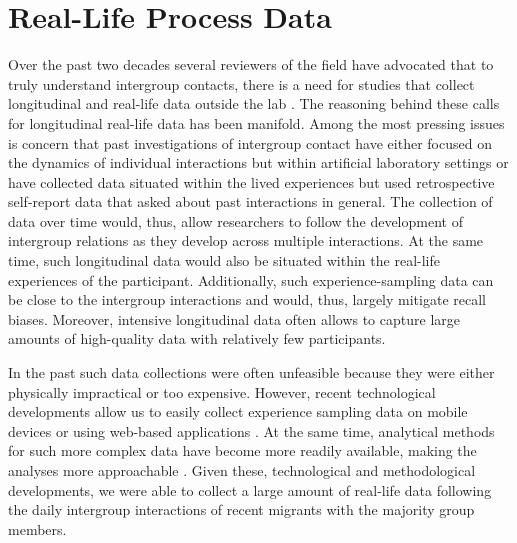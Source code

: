 \documentclass[man, 12pt, a4paper]{apa7}
\theoremstyle{break}
\theoremstyle{plain}
\begin{document}
\section{Real-Life Process Data}
Over the past two decades several reviewers of the field have advocated that to truly understand intergroup contacts, there is a need for studies that collect longitudinal \citep[][]{Pettigrew1998, Pettigrew2008, Pettigrew2008b, Pettigrew2011} and real-life data outside the lab \citep[][]{MacInnis2015, McKeown2017}. The reasoning behind these calls for longitudinal real-life data has been manifold. Among the most pressing issues is concern that past investigations of intergroup contact have either focused on the dynamics of individual interactions but within artificial laboratory settings or have collected data situated within the lived experiences but used retrospective self-report data that asked about past interactions in general. The collection of data over time would, thus, allow researchers to follow the development of intergroup relations as they develop across multiple interactions. At the same time, such longitudinal data would also be situated within the real-life experiences of the participant. Additionally, such experience-sampling data can be close to the intergroup interactions and would, thus, largely mitigate recall biases. Moreover, intensive longitudinal data often allows to capture large amounts of high-quality data with relatively few participants.

In the past such data collections were often unfeasible because they were either physically impractical or too expensive. However, recent technological developments allow us to easily collect experience sampling data on mobile devices \citep[e.g.,][]{Keil2020} or using web-based applications \citep[e.g.,][]{Arslan2020}. At the same time, analytical methods for such more complex data have become more readily available, making the analyses more approachable \citep[see, e.g.,][]{ODonnell2021}. Given these, technological and methodological developments, we were able to collect a large amount of real-life data following the daily intergroup interactions of recent migrants with the majority group members.  
\end{document}
